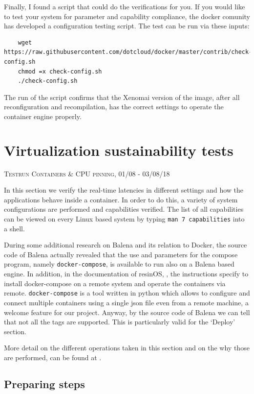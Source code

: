 \documentclass[]{scrartcl}
\begin{document}
Finally, I found a script that could do the verifications for you. If you would like to test your system for parameter and capability compliance, the docker comunity has developed a configuration testing script. The test can be run via these inputs:

\begin{verbatim}
	wget https://raw.githubusercontent.com/dotcloud/docker/master/contrib/check-config.sh
	chmod =x check-config.sh
	./check-config.sh
\end{verbatim}

The run of the script confirms that the Xenomai version of the image, after all reconfiguration and recompilation, has the correct settings to operate the container engine properly.

\section{Virtualization sustainability tests}

{\small\textsc{Testrun Containers \& CPU pinning, 01/08 - 03/08/18} \bigskip}

In this section we verify the real-time latencies in different settings and how the applications behave inside a container. In order to do this, a variety of system configurations are performed and capabilities verified. The list of all capabilities can be viewed on every Linux based system by typing \texttt{man 7 capabilities} into a shell.

During some additional research on Balena and its relation to Docker, the source code of Balena actually revealed that the use and parameters for the compose program, namely \texttt{docker-compose}, is available to run also on a Balena based engine. In addition, in the documentation of resinOS, \cite{resin03}, the instructions specify to install docker-compose on a remote system and operate the containers via remote.
\texttt{docker-compose} is a tool written in python which allows to configure and connect multiple containers using a single json file even from a remote machine, a welcome feature for our project.
Anyway, by the source code of Balena we can tell that not all the tags are supported. This is particularly valid for the `Deploy' section.

More detail on the different operations taken in this section and on the why those are performed, can be found at \cite{lrt01}.

\subsection{Preparing steps}
\end{document}
